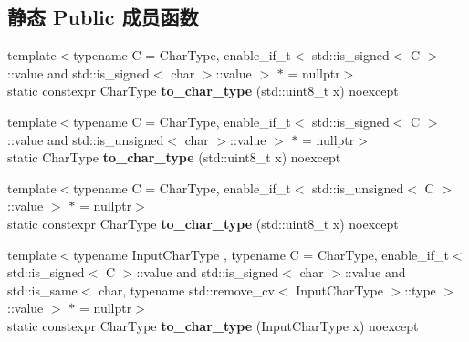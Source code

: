 \subsection*{静态 Public 成员函数}
\begin{DoxyCompactItemize}
\item 
\mbox{\label{classnlohmann_1_1detail_1_1binary__writer_ab77aa48692bd4e64e4f051ce6aeb6d2d}} 
{\footnotesize template$<$typename C  = Char\+Type, enable\+\_\+if\+\_\+t$<$ std\+::is\+\_\+signed$<$ C $>$\+::value and std\+::is\+\_\+signed$<$ char $>$\+::value $>$ $\ast$  = nullptr$>$ }\\static constexpr Char\+Type {\bfseries to\+\_\+char\+\_\+type} (std\+::uint8\+\_\+t x) noexcept
\item 
\mbox{\label{classnlohmann_1_1detail_1_1binary__writer_a5e46f0dd3550901b15cf85265808d1ec}} 
{\footnotesize template$<$typename C  = Char\+Type, enable\+\_\+if\+\_\+t$<$ std\+::is\+\_\+signed$<$ C $>$\+::value and std\+::is\+\_\+unsigned$<$ char $>$\+::value $>$ $\ast$  = nullptr$>$ }\\static Char\+Type {\bfseries to\+\_\+char\+\_\+type} (std\+::uint8\+\_\+t x) noexcept
\item 
\mbox{\label{classnlohmann_1_1detail_1_1binary__writer_ab77aa48692bd4e64e4f051ce6aeb6d2d}} 
{\footnotesize template$<$typename C  = Char\+Type, enable\+\_\+if\+\_\+t$<$ std\+::is\+\_\+unsigned$<$ C $>$\+::value $>$ $\ast$  = nullptr$>$ }\\static constexpr Char\+Type {\bfseries to\+\_\+char\+\_\+type} (std\+::uint8\+\_\+t x) noexcept
\item 
\mbox{\label{classnlohmann_1_1detail_1_1binary__writer_a2c2b2132ce56b3b45593374b622baa67}} 
{\footnotesize template$<$typename Input\+Char\+Type , typename C  = Char\+Type, enable\+\_\+if\+\_\+t$<$ std\+::is\+\_\+signed$<$ C $>$\+::value and std\+::is\+\_\+signed$<$ char $>$\+::value and std\+::is\+\_\+same$<$ char, typename std\+::remove\+\_\+cv$<$ Input\+Char\+Type $>$\+::type $>$\+::value $>$ $\ast$  = nullptr$>$ }\\static constexpr Char\+Type {\bfseries to\+\_\+char\+\_\+type} (Input\+Char\+Type x) noexcept
\end{DoxyCompactItemize}


